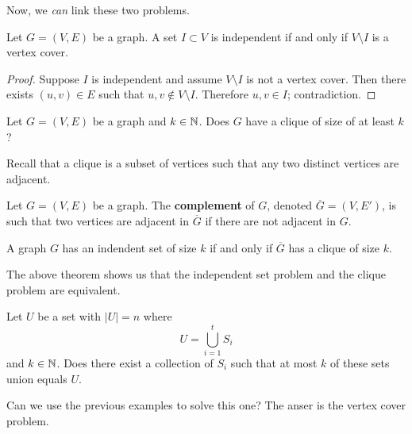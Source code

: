 Now, we \emph{can} link these two problems.

\begin{theorem}[]
    Let $G = (V,E)$ be a graph.
    A set $I \subset V$ is independent if and only if
    $V \setminus I$ is a vertex cover.
\end{theorem}

\begin{proof}
    Suppose $I$ is independent and assume $V \setminus I$ is not a vertex cover.
    Then there exists $(u,v) \in E$ such that $u,v \not \in V \setminus I$.
    Therefore $u,v \in I$; contradiction. 
\end{proof}

\begin{problem}
    Let $G = (V,E)$ be a graph and $k \in \mathbb{N}$.
    Does $G$ have a clique of size of at least $k$?
\end{problem}

\begin{remark}
    Recall that a clique is a subset of vertices such that 
    any two distinct vertices are adjacent.
\end{remark}

\begin{definition}[]
    Let $G = (V,E)$ be a graph.
    The \textbf{complement} of $G$, denoted $\overline G = (V, E')$, 
    is such that two vertices are adjacent in $\overline G$ if
    there are not adjacent in $G$.
\end{definition}

\begin{theorem}[]
    A graph $G$ has an indendent set of size $k$ if and only if
    $\overline G$ has a clique of size $k$.
\end{theorem}

The above theorem shows us that the independent set problem and
the clique problem are equivalent.

\begin{problem}
    Let $U$ be a set with $\lvert U \rvert = n$ where
    \[
        U = \bigcup_{i = 1}^t S_i
    \]
    and $k \in \mathbb{N}$.
    Does there exist a collection of $S_i$ such that
    at most $k$ of these sets union equals $U$.
\end{problem}

Can we use the previous examples to solve this one?
The anser is the vertex cover problem.
